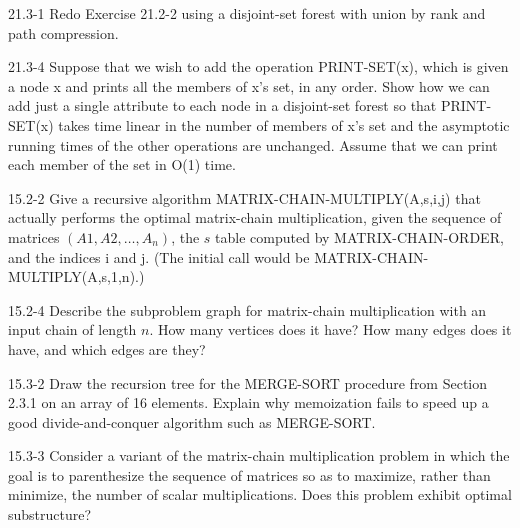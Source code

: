 

\usepackage{listings}




\homeworkheader{\classnameandsection}

\begin{problem}{21.3-1}
  Redo Exercise 21.2-2 using a disjoint-set forest with union by rank and path compression.
\end{problem}

\begin{problem}{21.3-4}
  Suppose that we wish to add the operation PRINT-SET(x), which is given a node x and prints all the members of x’s set,
  in any order. Show how we can add just a single attribute to each node in a disjoint-set forest so that PRINT-SET(x)
  takes time linear in the number of members of x’s set and the asymptotic running times of the other operations are
  unchanged. Assume that we can print each member of the set in O(1) time.
\end{problem}

\begin{problem}{15.2-2}
  Give a recursive algorithm MATRIX-CHAIN-MULTIPLY(A,s,i,j) that actually performs the optimal matrix-chain
  multiplication, given the sequence of matrices $(A1, A2, \ldots, A_n)$, the $s$ table computed by MATRIX-CHAIN-ORDER, and
  the indices i and j. (The initial call would be MATRIX-CHAIN-MULTIPLY(A,s,1,n).)
\end{problem}

\begin{problem}{15.2-4}
  Describe the subproblem graph for matrix-chain multiplication with an input chain of length $n$. How many vertices
  does it have? How many edges does it have, and which edges are they?
\end{problem}

\begin{problem}{15.3-2}
  Draw the recursion tree for the MERGE-SORT procedure from Section 2.3.1 on an array of 16 elements. Explain why
  memoization fails to speed up a good divide-and-conquer algorithm such as MERGE-SORT.
\end{problem}

\begin{problem}{15.3-3}
  Consider a variant of the matrix-chain multiplication problem in which the goal is to parenthesize the sequence of
  matrices so as to maximize, rather than minimize, the number of scalar multiplications. Does this problem exhibit
  optimal substructure?
\end{problem}


